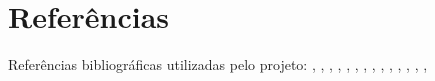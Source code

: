 \documentclass[12pt]{article}
\begin{document}
\section{Referências}

Referências bibliográficas utilizadas pelo projeto: \cite{uiintegration:07}, \cite{componentengineering}, \cite{DESOLDA201746}, \cite{6606685}, \cite{materialui:21}, \cite{STATEOCTOVERSE}, \cite{EMPOWERINGUI}, \cite{DONTMAKEMETHINK}, \cite{OPENSOURCEUSABILITY}, \cite{OPENSOURCEADOPTION}, \cite{4196485}, \cite{779128}, \cite{6048455}, \cite{7490575}, \cite{9089992}



\end{document}
